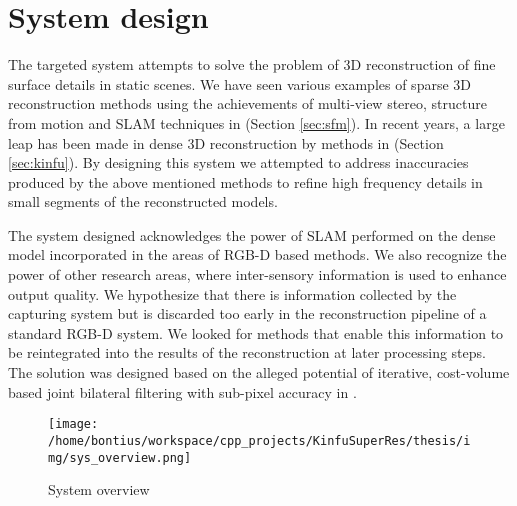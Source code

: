 \documentclass{ucl_thesis}
\newcommand{\secref}[1]{(Section \ref{#1})}
\begin{document}
\chapter{System design} 
\label{chp:my_system}

\par The targeted system attempts to solve the problem of 3D reconstruction of fine surface details in static scenes. We have seen various examples of sparse 3D reconstruction methods using the achievements of multi-view stereo, structure from motion and SLAM techniques in \secref{sec:sfm}. In recent years, a large leap has been made in dense 3D reconstruction by methods in \secref{sec:kinfu}. By designing this system we attempted to address inaccuracies produced by the above mentioned methods to refine high frequency details in small segments of the reconstructed models. \\

\par The system designed acknowledges the power of SLAM performed on the dense model incorporated in the areas of RGB-D based methods. We also recognize the power of other research areas, where inter-sensory information is used to enhance output quality. We hypothesize that there is information collected by the capturing system but is discarded too early in the reconstruction pipeline of a standard RGB-D system. We looked for methods that enable this information to be reintegrated into the results of the reconstruction at later processing steps. The solution was designed based on the alleged potential of iterative, cost-volume based joint bilateral filtering with sub-pixel accuracy in \citep{cvpr-07-qingxiong-yang}. \\

\begin{figure}[h!]\centering
    \texttt{[image: /home/bontius/workspace/cpp\_projects/KinfuSuperRes/thesis/img/sys\_overview.png]}
    \caption{System overview}
    \label{fig:sys_overview}
\end{figure}
\end{document}
